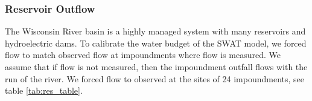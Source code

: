 \subsubsection{Reservoir Outflow}

The Wisconsin River basin is a highly managed system with many reservoirs and hydroelectric dams. To calibrate the water budget of the SWAT model, we forced flow to match observed flow at impoundments where flow is measured. We assume that if flow is not measured, then the impoundment outfall flows with the run of the river. We forced flow to observed at the sites of 24 impoundments, see table \ref{tab:res_table}.
\begin{landscape}

\end{landscape}


